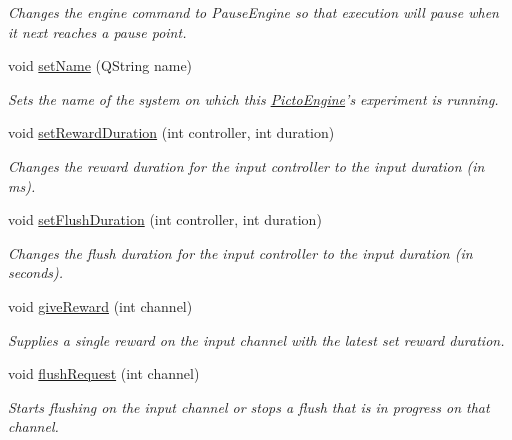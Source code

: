 \begin{DoxyCompactItemize}
\begin{DoxyCompactList}\small\item\em Changes the engine command to Pause\-Engine so that execution will pause when it next reaches a pause point. \end{DoxyCompactList}\item 
void \hyperlink{class_picto_1_1_engine_1_1_picto_engine_a0e83fe6c9e2769d97d3d7a5fffcbec5b}{set\-Name} (Q\-String name)
\begin{DoxyCompactList}\small\item\em Sets the name of the system on which this \hyperlink{class_picto_1_1_engine_1_1_picto_engine}{Picto\-Engine}'s experiment is running. \end{DoxyCompactList}\item 
void \hyperlink{class_picto_1_1_engine_1_1_picto_engine_ac4a7019049bb1decfb9eb813a2f7893c}{set\-Reward\-Duration} (int controller, int duration)
\begin{DoxyCompactList}\small\item\em Changes the reward duration for the input controller to the input duration (in ms). \end{DoxyCompactList}\item 
void \hyperlink{class_picto_1_1_engine_1_1_picto_engine_ac28b57e507c0e205573764e3eae4a8ac}{set\-Flush\-Duration} (int controller, int duration)
\begin{DoxyCompactList}\small\item\em Changes the flush duration for the input controller to the input duration (in seconds). \end{DoxyCompactList}\item 
void \hyperlink{class_picto_1_1_engine_1_1_picto_engine_a55c6bde2e8af2157edf79cef80533b67}{give\-Reward} (int channel)
\begin{DoxyCompactList}\small\item\em Supplies a single reward on the input channel with the latest set reward duration. \end{DoxyCompactList}\item 
void \hyperlink{class_picto_1_1_engine_1_1_picto_engine_ab388a122f147a8b48b495190af170f64}{flush\-Request} (int channel)
\begin{DoxyCompactList}\small\item\em Starts flushing on the input channel or stops a flush that is in progress on that channel. \end{DoxyCompactList}\end{DoxyCompactItemize}
